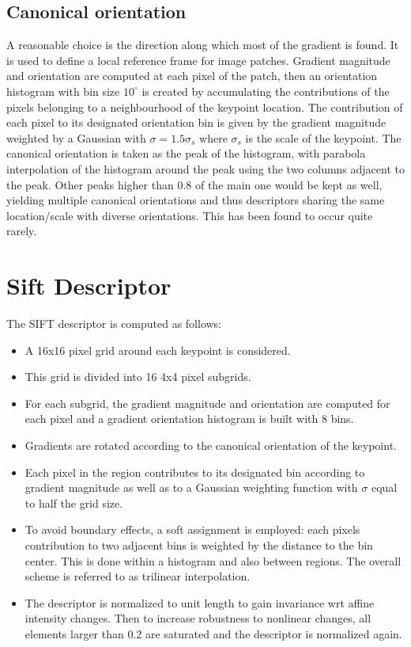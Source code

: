 \documentclass{article}
\begin{document}
\subsection{Canonical orientation}
A reasonable choice is the direction along which most of the gradient is found. It is used to define a local reference frame for image patches. Gradient magnitude and orientation are computed at each pixel of the patch, then an orientation histogram with bin size $10^\circ$ is created by accumulating the contributions of the pixels belonging to a neighbourhood of the keypoint location. The contribution of each pixel to its designated orientation bin is given by the gradient magnitude weighted by a Gaussian with $\sigma = 1.5\sigma_s$ where $\sigma_s$ is the scale of the keypoint. The canonical orientation is taken as the peak of the histogram, with parabola interpolation of the histogram around the peak using the two columns adjacent to the peak. Other peaks higher than 0.8 of the main one would be kept as well, yielding multiple canonical orientations and thus descriptors sharing the same location/scale with diverse orientations. This has been found to occur quite rarely.

\section{Sift Descriptor}
The SIFT descriptor is computed as follows: 
\begin{itemize}
    \item A 16x16 pixel grid around each keypoint is considered.
    \item This grid is divided into 16 4x4 pixel subgrids.
    \item For each subgrid, the gradient magnitude and orientation are computed for each pixel and a gradient orientation histogram is built with 8 bins.
    \item Gradients are rotated according to the canonical orientation of the keypoint.
    \item Each pixel in the region contributes to its designated bin according to gradient magnitude as well as to a Gaussian weighting function with $\sigma$ equal to half the grid size. 
    \item To avoid boundary effects, a soft assignment is employed: each pixels contribution to two adjacent bins is weighted by the distance to the bin center. This is done within a histogram and also between regions. The overall scheme is referred to as trilinear interpolation. 
    \item The descriptor is normalized to unit length to gain invariance wrt affine intensity changes. Then to increase robustness to nonlinear changes, all elements larger than 0.2 are saturated and the descriptor is normalized again.
\end{itemize}
\end{document}

